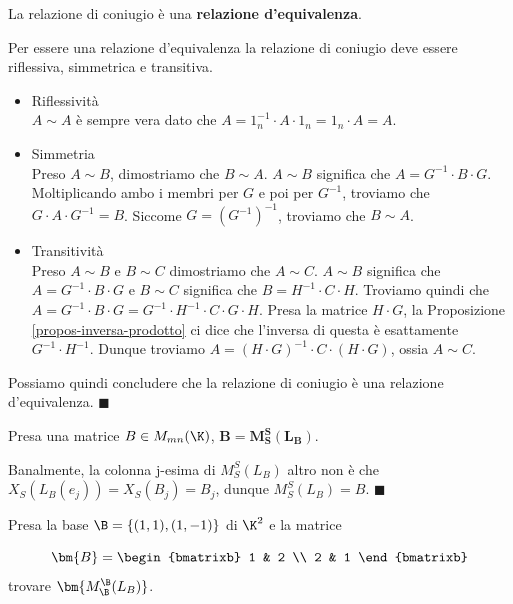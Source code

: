 \documentclass[11pt, a4paper, titlepage, oneside]{scrbook}
\begin{document}
\begin{Osservazione}[]
\label{oss-coniugio-rel-equiv}
La relazione di coniugio è una \textbf{relazione d'equivalenza}.
\end{Osservazione}

\Dimostrazione \nopagebreak

Per essere una relazione d'equivalenza la relazione di coniugio deve essere riflessiva, simmetrica e transitiva. 
\begin{itemize}
    \item Riflessività \\
    $A \sim A$ è sempre vera dato che $A = 1_n^{-1} \cdot A \cdot 1_n = 1_n \cdot A = A$. 
    \item Simmetria \\
    Preso $A \sim B$, dimostriamo che $B \sim A$. $A \sim B$ significa che $A = G^{-1} \cdot B \cdot G$. Moltiplicando ambo i membri per $G$ e poi per $G^{-1}$, troviamo che $G \cdot A \cdot G^{-1} = B$. Siccome $G = (G^{-1})^{-1}$, troviamo che $B \sim A$.
    \item Transitività \\
    Preso $A \sim B$ e $B \sim C$ dimostriamo che $A \sim C$. $A \sim B$ significa che $A = G^{-1} \cdot B \cdot G$ e $B \sim C$ significa che $B = H^{-1} \cdot C \cdot H$. Troviamo quindi che $A = G^{-1} \cdot B \cdot G = G^{-1} \cdot H^{-1} \cdot C \cdot G \cdot H$. Presa la matrice $H \cdot G$, la Proposizione \ref{propos-inversa-prodotto} ci dice che l'inversa di questa è esattamente $G^{-1} \cdot H^{-1}$. Dunque troviamo $A = (H \cdot G)^{-1} \cdot C \cdot (H \cdot G)$, ossia $A \sim C$.
\end{itemize}
Possiamo quindi concludere che la relazione di coniugio è una relazione d'equivalenza. $\blacksquare$

\begin{Osservazione}[]
\label{oss-B = M_S^S(L_B)}
Presa una matrice $B \in M_{mn}(\K)$, $\bm{B = M_S^S(L_B)}$.
\end{Osservazione}

\Dimostrazione \nopagebreak

Banalmente, la colonna j-esima di $M_S^S(L_B)$ altro non è che $X_S(L_B(e_j)) = X_S(B_j) = B_j$, dunque $M_S^S(L_B) = B$. $\blacksquare$

\Esempio \nopagebreak

Presa la base $\B = \{(1,1), (1,-1)\}$ di $\K^2$ e la matrice \nopagebreak

\[ \bm{B} = 
\begin{bmatrixb}
    1 & 2 \\
    2 & 1
\end{bmatrixb}
\]
trovare $\bm{M_\B^\B(L_B)}$. \nopagebreak
\end{document}
